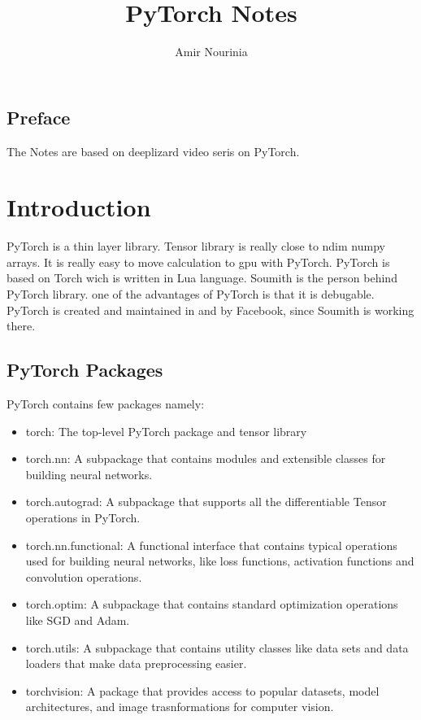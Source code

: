 \documentclass[11pt,twoside,a4paper]{report}
\title{PyTorch Notes}
\author{Amir Nourinia}
\begin{document}
\maketitle
\tableofcontents
\section{Preface}
The Notes are based on deeplizard video seris on PyTorch.
\chapter{Introduction}

PyTorch is a thin layer library. Tensor library is really close to ndim numpy arrays. It is really easy to move calculation to gpu with PyTorch.
PyTorch is based on Torch wich is written in Lua language. Soumith is the person behind PyTorch library. one of the advantages of PyTorch is that it is debugable.
PyTorch is created and maintained in and by Facebook, since Soumith is working there.

\section{PyTorch Packages}
PyTorch contains few packages namely:

\begin{itemize}
    \item torch: The top-level PyTorch package and tensor library
    \item torch.nn: A subpackage that contains modules and extensible classes for building neural networks.
    \item torch.autograd: A subpackage that supports all the differentiable Tensor operations in PyTorch.
    \item torch.nn.functional: A functional interface that contains typical operations used for building neural networks, like loss functions, activation functions and
    convolution operations.
    \item torch.optim: A subpackage that contains standard optimization operations like SGD and Adam.
    \item torch.utils: A subpackage that contains utility classes like data sets and data loaders that make data preprocessing easier.
    \item torchvision: A package that provides access to popular datasets, model architectures, and image trasnformations for computer vision.
\end{itemize}
\end{document}
